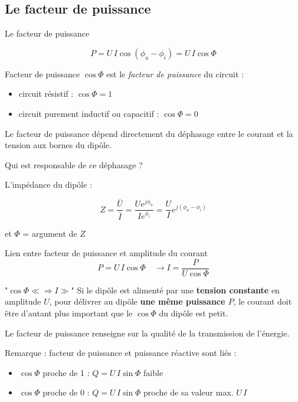 	\subsection{Le facteur de puissance}
	\begin{frame}{Le facteur de puissance}
	
		\[P=U\,I\cos(\phi_u-\phi_i)=U\,I\cos \Phi\]
		
		\begin{block}{Facteur de puissance}
		$\cos \Phi$ est le {\em facteur de puissance} du circuit :
		\begin{itemize}
			\item circuit résistif : $\cos \Phi=1$
			\item circuit purement inductif ou capacitif : $\cos \Phi=0$
		\end{itemize}
		\end{block}		
		
		
		Le facteur de puissance dépend directement du déphasage entre le
		courant et la tension aux bornes du dipôle.
		
		Qui est responsable de ce déphasage ? 
		
		L'impédance du dipôle : 
		
		\[Z=\frac{\bar{U}}{\bar{I}}=\frac{Ue^{j\phi_u}}{Ie^{\phi_i}}=\frac{U}{I}e^{j(\phi_u-\phi_i)}\]
		
		et $\Phi$ = argument de $Z$
	\end{frame}
	
	
	\begin{frame}{Lien entre facteur de puissance et amplitude du courant}
		\[P=U\,I\cos \Phi \quad \rightarrow I=\frac{P}{U\cos \Phi}\]
		
		\begin{block}{"$\cos \Phi \ll \Rightarrow I \gg$"}
		Si le dipôle est alimenté par une \textbf{tension constante} en amplitude $U$, pour délivrer au dipôle \textbf{une même puissance $P$}, le courant doit être  d'autant plus important que le $\cos \Phi$ du dipôle est petit.  
		\end{block}
		
		\vfill 
		Le facteur de puissance renseigne sur la qualité de la transmission de l'énergie.
		
		Remarque : facteur de puissance et puissance réactive sont liés :
		\begin{itemize}
			\item $\cos \Phi$ proche de 1 : $Q=U\,I\sin \Phi$ faible
			\item  $\cos \Phi$ proche de 0 : $Q=U\,I\sin \Phi$ proche de sa valeur
			max. $U\,I$
		\end{itemize}
	\end{frame}
	
